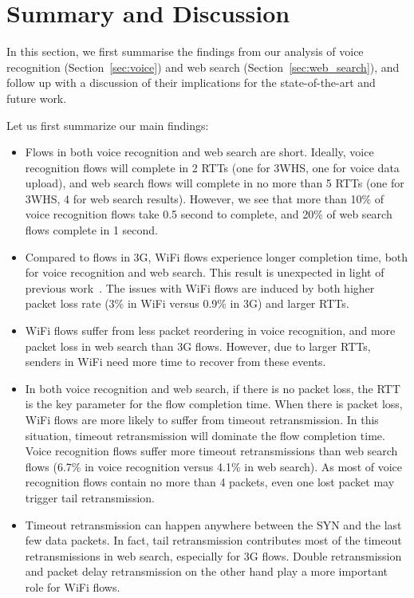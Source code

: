 
\section{Summary and Discussion}
\label{sec:discuss}

In this section, we first summarise the findings from our analysis of voice recognition (Section~\ref{sec:voice}) and web search (Section~\ref{sec:web_search}), and follow up with a discussion of their implications for the state-of-the-art and future work.

Let us first summarize our main findings:

\begin{itemize}
	\item Flows in both voice recognition and web search are short. Ideally, voice recognition flows will complete in 2 RTTs (one for 3WHS, one for voice data upload), and web search flows will complete in no more than 5 RTTs (one for 3WHS, 4 for web search results). However, we see that more than 10\% of voice recognition flows take 0.5 second to complete, and 20\% of web search flows complete in 1 second.

	\item Compared to flows in 3G, WiFi flows experience longer completion time, both for voice recognition and web search. This result is unexpected in light of previous work~\cite{deshpande2010performance,sommers2012cell}. The issues with WiFi flows are induced by both higher packet loss rate (3\% in WiFi versus 0.9\% in 3G) and larger RTTs.

	\item WiFi flows suffer from less packet reordering in voice recognition, and more packet loss in web search than 3G flows. However, due to larger RTTs, senders in WiFi need more time to recover from these events.

	\item In both voice recognition and web search, if there is no packet loss, the RTT is the key parameter for the flow completion time. When there is packet loss, WiFi flows are more likely to suffer from timeout retransmission. In this situation, timeout retransmission will dominate the flow completion time. Voice recognition flows suffer more timeout retransmissions than web search flows (6.7\% in voice recognition versus 4.1\% in web search). As most of voice recognition flows contain no more than 4 packets, even one lost packet may trigger tail retransmission. 

	\item Timeout retransmission can happen anywhere between the SYN and the last few data packets. In fact, tail retransmission contributes most of the timeout retransmissions in web search, especially for 3G flows. Double retransmission and packet delay retransmission on the other hand play a more important role for WiFi flows.
\end{itemize}

